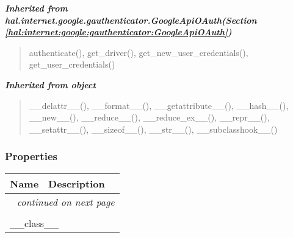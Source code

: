 \large{\textbf{\textit{Inherited from hal.internet.google.gauthenticator.GoogleApiOAuth\textit{(Section \ref{hal:internet:google:gauthenticator:GoogleApiOAuth})}}}}

\begin{quote}
authenticate(), get\_driver(), get\_new\_user\_credentials(), get\_user\_credentials()
\end{quote}

\large{\textbf{\textit{Inherited from object}}}

\begin{quote}
\_\_delattr\_\_(), \_\_format\_\_(), \_\_getattribute\_\_(), \_\_hash\_\_(), \_\_new\_\_(), \_\_reduce\_\_(), \_\_reduce\_ex\_\_(), \_\_repr\_\_(), \_\_setattr\_\_(), \_\_sizeof\_\_(), \_\_str\_\_(), \_\_subclasshook\_\_()
\end{quote}


  \subsubsection{Properties}

    \vspace{-1cm}
\hspace{\varindent}\begin{longtable}{|p{\varnamewidth}|p{\vardescrwidth}|l}
\cline{1-2}
\cline{1-2} \centering \textbf{Name} & \centering \textbf{Description}& \\
\cline{1-2}
\endhead\cline{1-2}\multicolumn{3}{r}{\small\textit{continued on next page}}\\\endfoot\cline{1-2}
\endlastfoot\multicolumn{2}{|l|}{\textit{Inherited from object}}\\
\multicolumn{2}{|p{\varwidth}|}{\raggedright \_\_class\_\_}\\
\cline{1-2}
\end{longtable}

